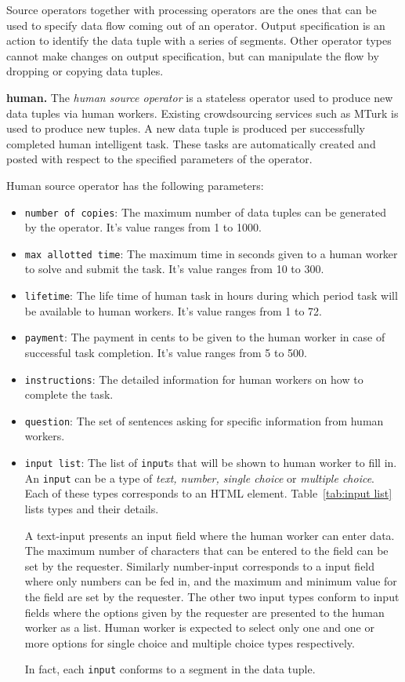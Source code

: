 Source operators together with processing operators are the ones that can be 
used to specify data flow coming out of an operator. Output specification is an 
action to identify the data tuple with a series of segments. Other operator types 
cannot make changes on output specification, but can manipulate the flow by dropping 
or copying data tuples.

\textbf{human.} 
The \textit{human source operator} is a stateless operator used to produce new data tuples 
via human workers. Existing crowdsourcing services such as MTurk is used 
to produce new tuples. A new data tuple is produced per successfully completed 
human intelligent task. These tasks are automatically created and posted with 
respect to the specified parameters of the operator.

Human source operator has the following parameters:
\begin{itemize}
	\item \texttt{number of copies}: The maximum number of data tuples can be 
	generated by the operator. It's value ranges from 1 to 1000.
	\item \texttt{max allotted time}: The maximum time in seconds given to a human 
	worker to solve and submit the task. It's value ranges from 10 to 300.
	\item \texttt{lifetime}: The life time of human task in hours during which period 
	task will be available to human workers. It's value ranges from 1 to 72.
	\item \texttt{payment}: The payment in cents to be given to the human worker in 
	case of successful task completion. It's value ranges from 5 to 500.
	\item \texttt{instructions}: The detailed information for human workers on how to 
	complete the task.
	\item \texttt{question}: The set of sentences asking for specific information from 
	human workers.
	\item \texttt{input list}: The list of \texttt{input}s that will be shown to human worker 
	to fill in. An \texttt{input} can be a type of \textit{text, number, single choice} or 
	\textit{multiple choice}. Each of these types corresponds to an HTML element. 
	Table~\ref{tab:input list} lists types and their details.
	
	A text-input presents an input field where the human worker can 
	enter data. The maximum number of characters that can be entered to the field can be 
	set by the requester. Similarly number-input corresponds to a input field where only 
	numbers can be fed in, and the maximum and minimum value for the field are set by 
	the requester. The other two input types conform to input fields where the options given 
	by the requester are presented to the human worker as a list. Human worker is expected 
	to select only one and one or more options for single choice and multiple choice types 
	respectively.
	
	In fact, each \texttt{input} conforms to a segment in the data tuple.
\end{itemize}

